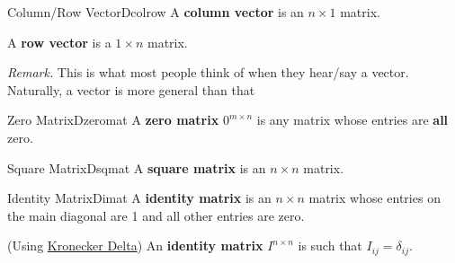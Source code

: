 \documentclass[oneside]{book}
\begin{document}
	\begin{defn}{Column/Row Vector}{Dcolrow}
		A \textbf{column vector} is an $n \times 1$ matrix.
		
		A \textbf{row vector} is a $1 \times n$ matrix.
	\end{defn}
	\textit{Remark.} This is what most people think of when they hear/say a vector. Naturally, a vector is more general than that
	\begin{defn}{Zero Matrix}{Dzeromat}
		A \textbf{zero matrix} $0^{m \times n}$ is any matrix whose entries are \textbf{all} zero.
	\end{defn}
	\begin{defn}{Square Matrix}{Dsqmat}
		A \textbf{square matrix} is an $n \times n$ matrix.
	\end{defn}
	\begin{defn}{Identity Matrix}{Dimat}
		A \textbf{identity matrix} is an $n \times n$ matrix whose entries on the main diagonal are 1 and all other entries are zero.
		
		(Using \href{https://en.wikipedia.org/wiki/Kronecker_delta}{Kronecker Delta}) An \textbf{identity matrix} $I^{n \times n}$ is such that $I_{ij}=\delta_{ij}$.
	\end{defn}

		
\end{document}
